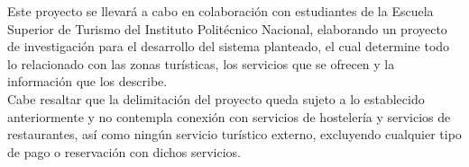 Este proyecto se llevará a cabo en colaboración con estudiantes de la Escuela Superior de Turismo del Instituto Politécnico Nacional, elaborando un proyecto de investigación para el desarrollo del sistema planteado, el cual determine todo lo relacionado con las zonas turísticas, los servicios que se ofrecen y la información que los  describe. \\

Cabe resaltar que la delimitación del proyecto queda sujeto a lo establecido anteriormente y no contempla conexión con servicios de hostelería y servicios de restaurantes, así como ningún servicio turístico externo, excluyendo cualquier tipo de pago o reservación con dichos servicios. \\

